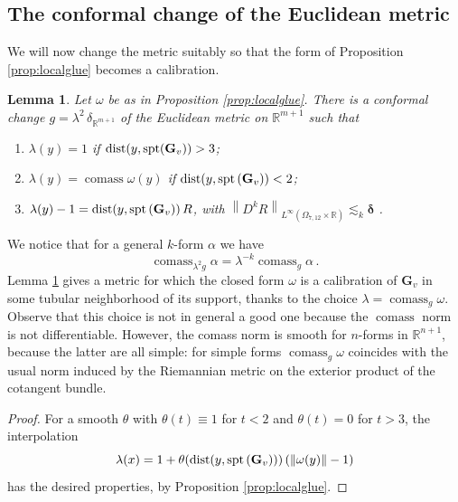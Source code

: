 \documentclass[reqno]{amsart}
\newtheorem{lemma}[theorem]{Lemma}
\theoremstyle{definition}
\theoremstyle{remark}
\numberwithin{equation}{section}
\newcommand{\norm}[1]{\left\lVert#1\right\rVert}
\newcommand{\R}{\mathbb{R}}
\DeclareMathOperator{\dist}{dist}
\newcommand{\bG}{\mathbf{G}} %
\begin{document}
\subsection{The conformal change of the  Euclidean metric}  We will now change the metric suitably so that the form of Proposition \ref{prop:localglue} becomes a calibration.

\begin{lemma}\label{lem.definition of the metric}
Let $\omega$ be as in Proposition \ref{prop:localglue}. There is a conformal change $g=\lambda^2 \,\delta_{\R^{m+1}}$ of the Euclidean metric on $\R^{m+1}$ such that 
\begin{enumerate}[label=(M.\arabic*)]
    \item\label{lem.definitioin of the metric-M1} $\lambda(y) =1 $ if $\dist(y,{\rm spt}(\bG_v))>3$;
    \item\label{lem.definitioin of the metric-M2} $\lambda(y)=\operatorname{comass} \omega(y)$ if $\dist(y, {\rm spt}\, (\bG_v))< 2$;
    \item\label{lem.definitioin of the metric-M3} $\lambda(y) -1= \dist(y,  {\rm spt}\, (\bG_v))\, R$, with $\norm{D^kR}_{L^\infty(\Omega_{7,12}\times \R)}\lesssim_k \boldsymbol{\delta}$ .
\end{enumerate}
\end{lemma}

 We notice that for a general $k$-form $\alpha$ we have 
\[ \operatorname{comass}_{\lambda^2 g}\alpha = \lambda^{-k}\operatorname{comass}_{g}\alpha\,.\]
Lemma \ref{lem.definition of the metric} gives a metric for which the closed form $\omega$ is a calibration of $\mathbf{G}_v$ in some tubular neighborhood of its support, thanks to the choice $\lambda= \operatorname{comass}_g{\omega}$. Observe that this choice is not in general a good one because the $\operatorname{comass}$ norm is not differentiable. However, the comass norm is smooth for $n$-forms in $\R^{n+1}$, because the latter are all simple: for simple forms $\operatorname{comass}_g\omega$ coincides with the usual norm induced by the Riemannian metric on the exterior product of the cotangent bundle.

\begin{proof}
    For a smooth $\theta$ with $\theta(t) \equiv 1$ for $t< 2$ and $\theta(t)=0$ for $t>3$, the interpolation
    \[ \lambda(x)=1+\theta(\dist(y,  {\rm spt}\, (\bG_v)))\left(\norm{\omega(y)}-1\right)\]
    has the desired properties, by Proposition \ref{prop:localglue}.
\end{proof}
\end{document}
